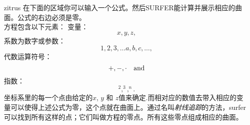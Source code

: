 ﻿\begin{surferPage}{zitrus}
在下面的区域你可以输入一个公式。然后SURFER能计算并展示相应的曲面。公式的右边必须是零。
\\
方程包含以下元素：
\newline
变量：
\[x, y, z, \]
系数为数字或参数：
\[1, 2, 3, \dots a, b, c, \dots, \]
代数运算符号：
\[+,  - , \cdot \quad \textnormal{and} \]
指数：
\[ ^2, ^3, ^n .\]
坐标系里的每一个点由给定的$x$, $y$ 和 $z$值来确定.而相对应的数值去带入相应的变量可以使得上述公式为零，这个点就在曲面上。通过名叫\textit{射线追踪}的方法，surfer可以找到所有这样的点；它们叫做方程的零点。所有这些零点组成相应的曲面。
\end{surferPage}


